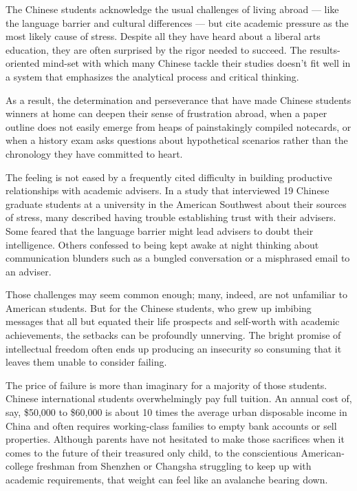 The Chinese students acknowledge the usual challenges of living abroad
--- like the language barrier and cultural differences --- but cite
academic pressure as the most likely cause of stress. Despite all they
have heard about a liberal arts education, they are often surprised by
the rigor needed to succeed. The results-oriented mind-set with which
many Chinese tackle their studies doesn't fit well in a system that
emphasizes the analytical process and critical thinking.

As a result, the determination and perseverance that have made Chinese
students winners at home can deepen their sense of frustration abroad,
when a paper outline does not easily emerge from heaps of painstakingly
compiled notecards, or when a history exam asks questions about
hypothetical scenarios rather than the chronology they have committed to
heart.

The feeling is not eased by a frequently cited difficulty in building
productive relationships with academic advisers. In a study that
interviewed 19 Chinese graduate students at a university in the American
Southwest about their sources of stress, many described having trouble
establishing trust with their advisers. Some feared that the language
barrier might lead advisers to doubt their intelligence. Others
confessed to being kept awake at night thinking about communication
blunders such as a bungled conversation or a misphrased email to an
adviser.

Those challenges may seem common enough; many, indeed, are not
unfamiliar to American students. But for the Chinese students, who grew
up imbibing messages that all but equated their life prospects and
self-worth with academic achievements, the setbacks can be profoundly
unnerving. The bright promise of intellectual freedom often ends up
producing an insecurity so consuming that it leaves them unable to
consider failing.

The price of failure is more than imaginary for a majority of those
students. Chinese international students overwhelmingly pay full
tuition. An annual cost of, say, \$50,000 to \$60,000 is about 10 times
the average urban disposable income in China and often requires
working-class families to empty bank accounts or sell properties.
Although parents have not hesitated to make those sacrifices when it
comes to the future of their treasured only child, to the conscientious
American-college freshman from Shenzhen or Changsha struggling to keep
up with academic requirements, that weight can feel like an avalanche
bearing down.

